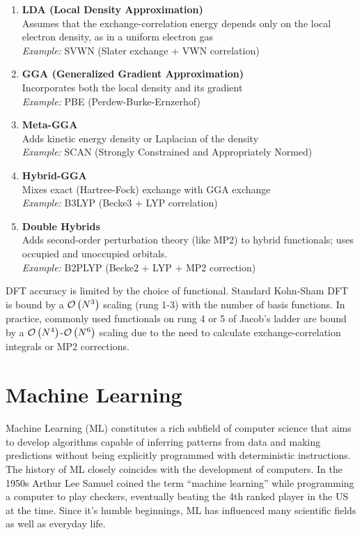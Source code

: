 \begin{enumerate}
    \item \textbf{LDA (Local Density Approximation)}\\
    Assumes that the exchange-correlation energy depends only on the local electron density, as in a uniform electron gas\\
    \textit{Example:} SVWN (Slater exchange + VWN correlation) \parencite{ref:slater1951, ref:vwn1980}

    \item \textbf{GGA (Generalized Gradient Approximation)}\\
    Incorporates both the local density and its gradient\\
    \textit{Example:} PBE (Perdew-Burke-Ernzerhof) \parencite{ref:perdew1996}

    \item \textbf{Meta-GGA}\\
    Adds kinetic energy density or Laplacian of the density\\
    \textit{Example:} SCAN (Strongly Constrained and Appropriately Normed) \parencite{ref:scan2015}

    \item \textbf{Hybrid-GGA}\\
    Mixes exact (Hartree-Fock) exchange with GGA exchange\\
    \textit{Example:} B3LYP (Becke3 + LYP correlation) \parencite{ref:lee_yang_parr_1988, ref:becke_1993}

    \item \textbf{Double Hybrids}\\
    Adds second-order perturbation theory (like MP2) to hybrid functionals; uses occupied and unoccupied orbitals.\\
    \textit{Example:} B2PLYP (Becke2 + LYP + MP2 correction) \parencite{ref:grimme2006}
\end{enumerate}
DFT accuracy is limited by the choice of functional. Standard Kohn-Sham DFT is bound by a $\mathcal{O}\left(N^3\right)$ scaling (rung 1-3) with the number of basis functions. In practice, commonly used functionals on rung 4 or 5 of Jacob's ladder are bound by a $\mathcal{O}\left(N^4\right)$-$\mathcal{O}\left(N^6\right)$ scaling due to the need to calculate exchange-correlation integrals or MP2 corrections.


\section{Machine Learning}
\label{sec:background_ml}
Machine Learning (ML) constitutes a rich subfield of computer science that aims to develop algorithms capable of inferring patterns from data and making predictions without being explicitly programmed with deterministic instructions. \\
The history of ML closely coincides with the development of computers. In the 1950s Arthur Lee Samuel coined the term ``machine learning'' while programming a computer to play checkers, eventually beating the 4th ranked player in the US at the time. \parencite{ref:knuth1989comments} Since it's humble beginnings, ML has influenced many scientific fields as well as everyday life.\\

